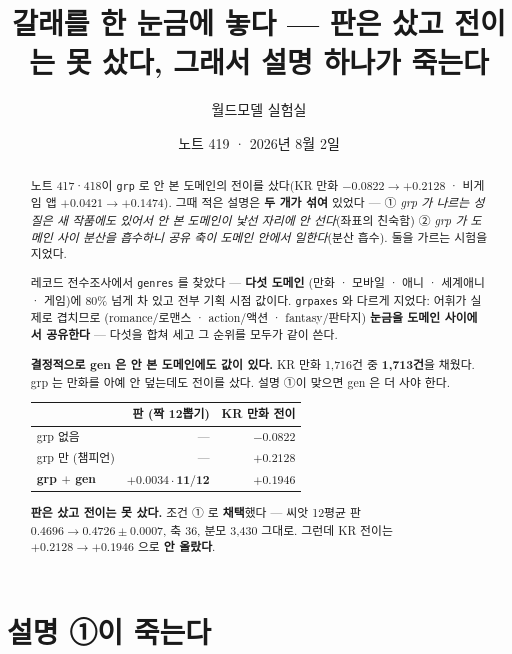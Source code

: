 \documentclass[11pt]{article}
\begin{document}
\title{갈래를 한 눈금에 놓다 --- 판은 샀고 전이는 못 샀다, 그래서 설명 하나가 죽는다}
\author{월드모델 실험실}
\date{노트 419 · 2026년 8월 2일}
\maketitle

\begin{abstract}
노트 417·418이 \texttt{grp} 로 안 본 도메인의 전이를 샀다(KR 만화
$-0.0822 \to +0.2128$ · 비게임 앱 $+0.0421 \to +0.1474$). 그때 적은 설명은
\textbf{두 개가 섞여} 있었다 --- ① \emph{grp 가 나르는 성질은 새 작품에도
있어서 안 본 도메인이 낯선 자리에 안 선다}(좌표의 친숙함) ② \emph{grp 가
도메인 사이 분산을 흡수하니 공유 축이 도메인 안에서 일한다}(분산 흡수).
둘을 가르는 시험을 지었다.

레코드 전수조사에서 \texttt{genres} 를 찾았다 --- \textbf{다섯 도메인}
(만화 · 모바일 · 애니 · 세계애니 · 게임)에 $80\%$ 넘게 차 있고 전부 기획
시점 값이다. \texttt{grpaxes} 와 다르게 지었다: 어휘가 실제로 겹치므로
(romance/로맨스 · action/액션 · fantasy/판타지) \textbf{눈금을 도메인
사이에서 공유한다} --- 다섯을 합쳐 세고 그 순위를 모두가 같이 쓴다.

\textbf{결정적으로 gen 은 안 본 도메인에도 값이 있다.} KR 만화 1{,}716건 중
\textbf{1{,}713건}을 채웠다. grp 는 만화를 아예 안 덮는데도 전이를 샀다.
설명 ①이 맞으면 gen 은 더 사야 한다.

\begin{center}
\begin{tabular}{lrr}
\hline
 & 판 (짝 12뽑기) & KR 만화 전이 \\
\hline
grp 없음 & --- & $-0.0822$ \\
grp 만 (챔피언) & --- & $\mathbf{+0.2128}$ \\
\textbf{grp $+$ gen} & $\mathbf{+0.0034 \cdot 11/12}$ & $+0.1946$ \\
\hline
\end{tabular}
\end{center}

\textbf{판은 샀고 전이는 못 샀다.} 조건 ① 로 \textbf{채택}했다 --- 씨앗
12평균 판 $0.4696 \to \mathbf{0.4726 \pm 0.0007}$, 축 36, 분모 3{,}430 그대로.
그런데 KR 전이는 $+0.2128 \to +0.1946$ 으로 \textbf{안 올랐다}.
\end{abstract}

\section{설명 ①이 죽는다}
\end{document}
